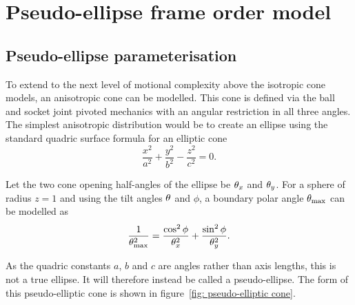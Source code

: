 
\section{Pseudo-ellipse frame order model}





\subsection{Pseudo-ellipse parameterisation}

To extend to the next level of motional complexity above the isotropic cone models, an anisotropic cone can be modelled.
This cone is defined via the ball and socket joint pivoted mechanics with an angular restriction in all three angles.
The simplest anisotropic distribution would be to create an ellipse using the standard quadric surface formula for an elliptic cone
\begin{equation}
    \frac{x^2}{a^2} + \frac{y^2}{b^2} - \frac{z^2}{c^2} = 0 .
\end{equation}

Let the two cone opening half-angles of the ellipse be $\theta_x$ and $\theta_y$.
For a sphere of radius $z = 1$ and using the tilt angles $\theta$ and $\phi$, a boundary polar angle $\theta_\textrm{max}$ can be modelled as
\begin{equation} \label{eq: pseudo-ellipse}
    \frac{1}{\theta_\textrm{max}^2} = \frac{\cos^2\phi}{\theta_x^2} + \frac{\sin^2\phi}{\theta_y^2} .
\end{equation}

As the quadric constants $a$, $b$ and $c$ are angles rather than axis lengths, this is not a true ellipse.
It will therefore instead be called a pseudo-ellipse.
The form of this pseudo-elliptic cone is shown in figure~\ref{fig: pseudo-elliptic cone}.

